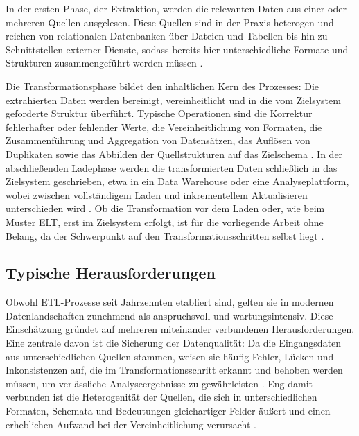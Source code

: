 In der ersten Phase, der Extraktion, werden die relevanten Daten aus einer oder mehreren Quellen ausgelesen. Diese Quellen sind in der Praxis heterogen und reichen von relationalen Datenbanken über Dateien und Tabellen bis hin zu Schnittstellen externer Dienste, sodass bereits hier unterschiedliche Formate und Strukturen zusammengeführt werden müssen \autocite{walhaDataIntegrationTraditional2024}.

Die Transformationsphase bildet den inhaltlichen Kern des Prozesses: Die extrahierten Daten werden bereinigt, vereinheitlicht und in die vom Zielsystem geforderte Struktur überführt. Typische Operationen sind die Korrektur fehlerhafter oder fehlender Werte, die Vereinheitlichung von Formaten, die Zusammenführung und Aggregation von Datensätzen, das Auflösen von Duplikaten sowie das Abbilden der Quellstrukturen auf das Zielschema \autocite{khanOverviewETLTechniques2024,walhaDataIntegrationTraditional2024,raviETLExtractTransform2025}. In der abschließenden Ladephase werden die transformierten Daten schließlich in das Zielsystem geschrieben, etwa in ein Data Warehouse oder eine Analyseplattform, wobei zwischen vollständigem Laden und inkrementellem Aktualisieren unterschieden wird \autocite{khanOverviewETLTechniques2024,boulahiaMulticriteriaEvaluationResearch2024}. Ob die Transformation vor dem Laden oder, wie beim Muster \ac{ELT}, erst im Zielsystem erfolgt, ist für die vorliegende Arbeit ohne Belang, da der Schwerpunkt auf den Transformationsschritten selbst liegt \autocite{walhaDataIntegrationTraditional2024,raviETLExtractTransform2025}.

\subsection{Typische Herausforderungen}
\label{subsec:etl-herausforderungen}

Obwohl \ac{ETL}-Prozesse seit Jahrzehnten etabliert sind, gelten sie in modernen Datenlandschaften zunehmend als anspruchsvoll und wartungsintensiv. Diese Einschätzung gründet auf mehreren miteinander verbundenen Herausforderungen. Eine zentrale davon ist die Sicherung der Datenqualität: Da die Eingangsdaten aus unterschiedlichen Quellen stammen, weisen sie häufig Fehler, Lücken und Inkonsistenzen auf, die im Transformationsschritt erkannt und behoben werden müssen, um verlässliche Analyseergebnisse zu gewährleisten \autocite{khanOverviewETLTechniques2024,rangineniReviewEnhancingData2023}. Eng damit verbunden ist die Heterogenität der Quellen, die sich in unterschiedlichen Formaten, Schemata und Bedeutungen gleichartiger Felder äußert und einen erheblichen Aufwand bei der Vereinheitlichung verursacht \autocite{walhaDataIntegrationTraditional2024,khanOverviewETLTechniques2024}.

